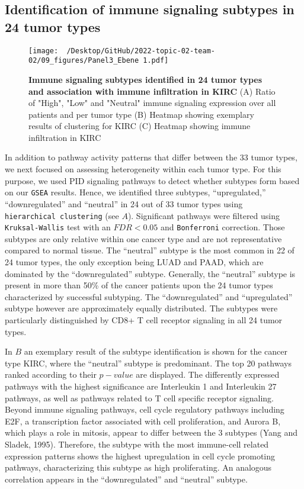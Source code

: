 \documentclass[
  parskip,
  oneside]{scrreprt}
\begin{document}
\hypertarget{identification-of-immune-signaling-subtypes-in-24-tumor-types}{%
\subsection{Identification of immune signaling subtypes in 24 tumor
types}\label{identification-of-immune-signaling-subtypes-in-24-tumor-types}}

\begin{figure}[h]
  \texttt{[image: ~/Desktop/GitHub/2022-topic-02-team-02/09\_figures/Panel3\_Ebene 1.pdf]}
  \caption{\textbf{Immune signaling subtypes identified in 24 tumor types and association with immune infiltration in KIRC} (A) Ratio of "High", "Low" and "Neutral" immune signaling expression over all patients and per tumor type (B) Heatmap showing exemplary results of clustering for KIRC (C) Heatmap showing immune infiltration in KIRC}
  \label{pengplot}
\end{figure}

In addition to pathway activity patterns that differ between the 33
tumor types, we next focused on assessing heterogeneity within each
tumor type. For this purpose, we used PID signaling pathways to detect
whether subtypes form based on our \texttt{GSEA} results. Hence, we
identified three subtypes, ``upregulated,'' ``downregulated'' and
``neutral'' in 24 out of 33 tumor types using
\texttt{hierarchical\ clustering} (see  \(A\)).
Significant pathways were filtered using \texttt{Kruksal-Wallis} test
with an \(FDR < 0.05\) and \texttt{Bonferroni} correction. Those
subtypes are only relative within one cancer type and are not
representative compared to normal tissue. The ``neutral'' subtype is the
most common in 22 of 24 tumor types, the only exception being LUAD and
PAAD, which are dominated by the ``downregulated'' subtype. Generally,
the ``neutral'' subtype is present in more than 50\% of the cancer
patients upon the 24 tumor types characterized by successful subtyping.
The ``downregulated'' and ``upregulated'' subtype however are
approximately equally distributed. The subtypes were particularly
distinguished by CD8+ T cell receptor signaling in all 24 tumor types.

In  \(B\) an exemplary result of the subtype
identification is shown for the cancer type KIRC, where the ``neutral''
subtype is predominant. The top 20 pathways ranked according to their
\(p-value\) are displayed. The differently expressed pathways with the
highest significance are Interleukin 1 and Interleukin 27 pathways, as
well as pathways related to T cell specific receptor signaling. Beyond
immune signaling pathways, cell cycle regulatory pathways including E2F,
a transcription factor associated with cell proliferation, and Aurora B,
which plays a role in mitosis, appear to differ between the 3 subtypes
(Yang and Sladek, 1995). Therefore, the subtype with the most
immune-cell related expression patterns shows the highest upregulation
in cell cycle promoting pathways, characterizing this subtype as high
proliferating. An analogous correlation appears in the ``downregulated''
and ``neutral'' subtype.
\end{document}
